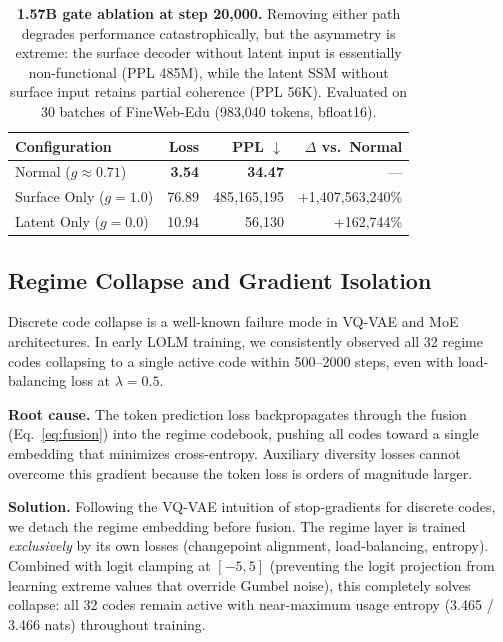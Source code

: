 \documentclass{article}
\begin{document}
\begin{table}[t]
\centering
\caption{\textbf{1.57B gate ablation at step 20{,}000.} Removing either path
degrades performance catastrophically, but the asymmetry is extreme: the
surface decoder without latent input is essentially non-functional (PPL 485M),
while the latent SSM without surface input retains partial coherence (PPL 56K).
Evaluated on 30 batches of FineWeb-Edu (983{,}040 tokens, bfloat16).}
\label{tab:gate_ablation_1b}
\vspace{0.5em}
\begin{tabular}{lrrr}
\toprule
\textbf{Configuration} & \textbf{Loss} & \textbf{PPL} $\downarrow$ & \textbf{$\Delta$ vs.\ Normal} \\
\midrule
Normal ($g \approx 0.71$) & \textbf{3.54} & \textbf{34.47} & --- \\
Surface Only ($g = 1.0$) & 76.89 & 485{,}165{,}195 & +1{,}407{,}563{,}240\% \\
Latent Only ($g = 0.0$) & 10.94 & 56{,}130 & +162{,}744\% \\
\bottomrule
\end{tabular}
\end{table}

\subsection{Regime Collapse and Gradient Isolation}
\label{sec:ablation_collapse}

Discrete code collapse is a well-known failure mode in VQ-VAE and MoE
architectures. In early LOLM training, we consistently observed all 32 regime
codes collapsing to a single active code within 500--2000 steps, even with
load-balancing loss at $\lambda = 0.5$.

\textbf{Root cause.} The token prediction loss backpropagates through the fusion
(Eq.~\ref{eq:fusion}) into the regime codebook, pushing all codes toward a
single embedding that minimizes cross-entropy. Auxiliary diversity losses cannot
overcome this gradient because the token loss is orders of magnitude larger.

\textbf{Solution.} Following the VQ-VAE intuition of stop-gradients for
discrete codes, we detach the regime embedding before fusion. The regime layer
is trained \emph{exclusively} by its own losses (changepoint alignment,
load-balancing, entropy). Combined with logit clamping at $[-5, 5]$ (preventing
the logit projection from learning extreme values that override Gumbel noise),
this completely solves collapse: all 32 codes remain active with near-maximum
usage entropy (3.465 / 3.466 nats) throughout training.
\end{document}

